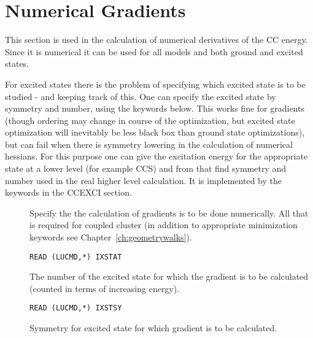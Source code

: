 %
\section{Numerical Gradients}\label{sec:ccgr}
%

This section is used in the calculation of numerical derivatives
of the CC energy. Since it is numerical it can be used for all models
and both ground and excited states.

For excited states there is the problem of specifying 
which excited state is to be studied - and keeping track of this.
One can specify the excited state by symmetry and number, using the keywords below.
This works fine for gradients (though ordering may change in course of the
optimization, but excited state optimization will inevitably be less black box
than ground state optimizations), but can fail when there is symmetry lowering
in the calculation of numerical hessians. 
For this purpose one can give the excitation energy for the appropriate state at a lower level 
(for example CCS) and from that find symmetry and number used in the real higher level calculation.
It is implemented by the keywords in the CCEXCI section.

\begin{description}

\item[] 

Specify the the calculation of gradients is to be done numerically.
All that is required for coupled cluster (in addition to appropriate minimization
keywords see Chapter~\ref{ch:geometrywalks}).

\item[] 

\verb|READ (LUCMD,*) IXSTAT|\newline

The number of the excited state for which the  gradient is to be calculated 
(counted in terms of increasing energy).

\item[] 

\verb|READ (LUCMD,*) IXSTSY|\newline

Symmetry for excited state for which gradient is to be calculated.


\end{description}
